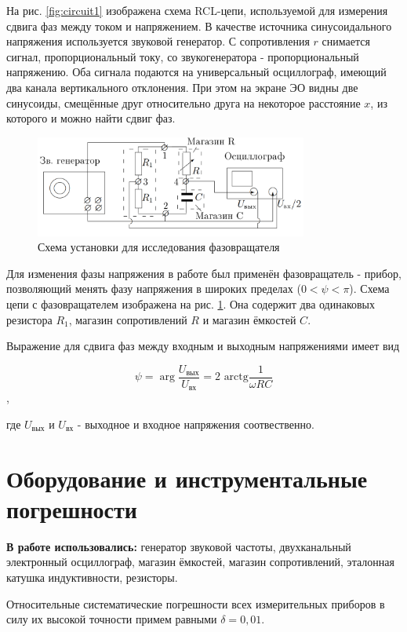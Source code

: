 \documentclass[a4paper,12pt]{article} %
\begin{document}
На рис. \ref{fig:circuit1} изображена схема RCL-цепи, используемой для измерения сдвига фаз между током и напряжением. В качестве источника синусоидального напряжения используется звуковой генератор. С сопротивления $r$ снимается сигнал, пропорциональный току, со звукогенератора - пропорциональный напряжению. Оба сигнала подаются на универсальный осциллограф, имеющий два канала вертикального отклонения. При этом на экране ЭО видны две синусоиды, смещённые друг относительно друга на некоторое расстояние $x$, из которого и можно найти сдвиг фаз.

\begin{figure}
    \centering
    \includegraphics[width = 0.8\textwidth]{circuit2.png}
    \caption{Схема установки для исследования фазовращателя}
    \label{fig:circuit2}
\end{figure}

Для изменения фазы напряжения в работе был применён фазовращатель - прибор, позволяющий менять фазу напряжения в широких пределах ($0 < \psi < \pi$). Схема цепи с фазовращателем изображена на рис. \ref{fig:circuit2}. Она содержит два одинаковых резистора $R_1$, магазин сопротивлений $R$ и магазин ёмкостей $C$.

Выражение для сдвига фаз между входным и выходным напряжениями имеет вид

$$\psi = \arg \frac{U_\text{вых}}{U_\text{вх}} = 2 \text{ arctg} \frac{1}{\omega RC} $$,

где $U_\text{вых}$ и $U_\text{вх}$ - выходное и входное напряжения соотвественно.

\section{Оборудование и инструментальные погрешности}

\textbf{В работе использовались:} генератор звуковой частоты, двухканальный электронный осциллограф, магазин ёмкостей, магазин сопротивлений, эталонная катушка индуктивности, резисторы.

Относительные систематические погрешности всех измерительных приборов в силу их высокой точности примем равными $\delta = 0,01$.
\end{document}
